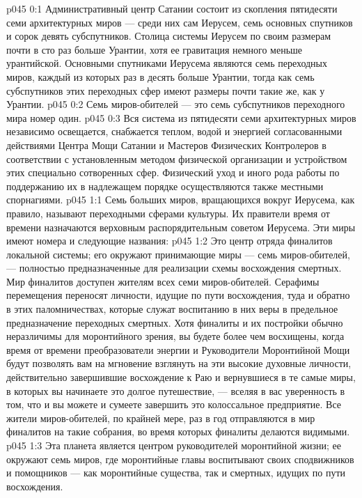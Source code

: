 \author{Мелхиседек}
\vs p045 0:1 Административный центр Сатании состоит из скопления пятидесяти семи архитектурных миров --- среди них сам Иерусем, семь основных спутников и сорок девять субспутников. Столица системы Иерусем по своим размерам почти в сто раз больше Урантии, хотя ее гравитация немного меньше урантийской. Основными спутниками Иерусема являются семь переходных миров, каждый из которых раз в десять больше Урантии, тогда как семь субспутников этих переходных сфер имеют размеры почти такие же, как у Урантии.
\vs p045 0:2 Семь миров\hyp{}обителей --- это семь субспутников переходного мира номер один.
\vs p045 0:3 Вся система из пятидесяти семи архитектурных миров независимо освещается, снабжается теплом, водой и энергией согласованными действиями Центра Мощи Сатании и Мастеров Физических Контролеров в соответствии с установленным методом физической организации и устройством этих специально сотворенных сфер. Физический уход и иного рода работы по поддержанию их в надлежащем порядке осуществляются также местными спорнагиями.
\vs p045 1:1 Семь больших миров, вращающихся вокруг Иерусема, как правило, называют переходными сферами культуры. Их правители время от времени назначаются верховным распорядительным советом Иерусема. Эти миры имеют номера и следующие названия:
\vs p045 1:2 \pc {} Это центр отряда финалитов локальной системы; его окружают принимающие миры --- семь миров\hyp{}обителей, --- полностью предназначенные для реализации схемы восхождения смертных. Мир финалитов доступен жителям всех семи миров\hyp{}обителей. Серафимы перемещения переносят личности, идущие по пути восхождения, туда и обратно в этих паломничествах, которые служат воспитанию в них веры в предельное предназначение переходных смертных. Хотя финалиты и их постройки обычно неразличимы для моронтийного зрения, вы будете более чем восхищены, когда время от времени преобразователи энергии и Руководители Моронтийной Мощи будут позволять вам на мгновение взглянуть на эти высокие духовные личности, действительно завершившие восхождение к Раю и вернувшиеся в те самые миры, в которых вы начинаете это долгое путешествие, --- вселяя в вас уверенность в том, что и вы можете и сумеете завершить это колоссальное предприятие. Все жители миров\hyp{}обителей, по крайней мере, раз в год отправляются в мир финалитов на такие собрания, во время которых финалиты делаются видимыми.
\vs p045 1:3 \pc {} Эта планета является центром руководителей моронтийной жизни; ее окружают семь миров, где моронтийные главы воспитывают своих сподвижников и помощников --- как моронтийные существа, так и смертных, идущих по пути восхождения.
